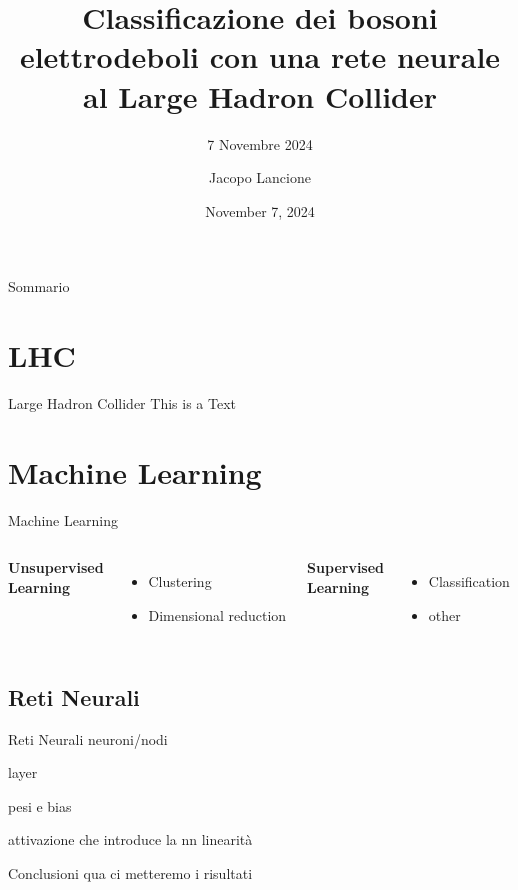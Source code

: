 \documentclass{beamer}
\title{Classificazione dei bosoni elettrodeboli con una rete neurale al Large Hadron Collider}
\subtitle{7 Novembre 2024}
\date{November 7, 2024}
\author{Jacopo Lancione}
\begin{document}
\begin{frame}
    \titlepage
\end{frame}

\begin{frame}{Sommario}
    \tableofcontents
\end{frame}


\section{LHC}
\begin{frame}{Large Hadron Collider}
    This is a Text
\end{frame}

\section{Machine Learning}
\begin{frame}{Machine Learning}
  \begin{columns}
    \begin{block}{}
      \centering
      \textbf{
      Unsupervised\\[.5ex]
      Learning}
    \end{block}
    \vspace*{2ex}
    \begin{itemize}
      \item Clustering
      \item Dimensional reduction
    \end{itemize}

    \begin{block}{}
      \centering
      \textbf{
      Supervised\\[.5ex]
      Learning}
    \end{block}
    \vspace*{2ex}
    \begin{itemize}
      \item Classification
      \item other
    \end{itemize}
  \end{columns}

\end{frame}

\subsection{Reti Neurali}
\begin{frame}{Reti Neurali}
  neuroni/nodi

  layer

  pesi e bias

  attivazione che introduce la nn linearità 


\end{frame}



\begin{frame}{Conclusioni}
  qua ci metteremo i risultati
\end{frame}
\end{document}
